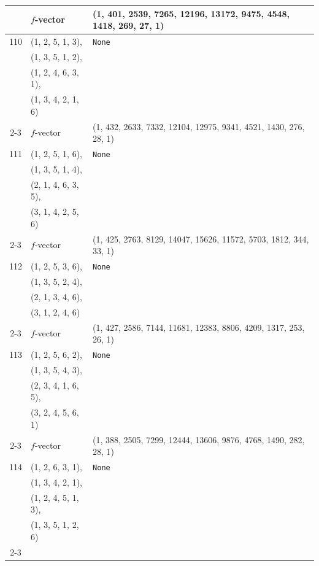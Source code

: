\documentclass[10pt]{amsart}
\numberwithin{equation}{section}
\theoremstyle{plain}
\theoremstyle{definition}
\theoremstyle{remark}
\begin{document}
{\begin{longtable}{c|l|l}
		& $f$-vector & {(1, 401, 2539, 7265, 12196, 13172, 9475, 4548, 1418, 269, 27, 1)} \\
		\midrule
		
		110 & (1, 2, 5, 1, 3), & \texttt{None} \\
		& (1, 3, 5, 1, 2), &  \\
		& (1, 2, 4, 6, 3, 1), &  \\
		& (1, 3, 4, 2, 1, 6) &  \\ \cline{2-3}
		
		& $f$-vector & {(1, 432, 2633, 7332, 12104, 12975, 9341, 4521, 1430, 276, 28, 1)} \\
		\midrule
		
		111 & (1, 2, 5, 1, 6), & \texttt{None} \\
		& (1, 3, 5, 1, 4), &  \\
		& (2, 1, 4, 6, 3, 5), &  \\
		& (3, 1, 4, 2, 5, 6) &  \\ \cline{2-3}
		
		& $f$-vector & {(1, 425, 2763, 8129, 14047, 15626, 11572, 5703, 1812, 344, 33, 1)} \\
		\midrule
		
		112 & (1, 2, 5, 3, 6), & \texttt{None} \\
		& (1, 3, 5, 2, 4), &  \\
		& (2, 1, 3, 4, 6), &  \\
		& (3, 1, 2, 4, 6) &  \\ \cline{2-3}
		
		& $f$-vector & {(1, 427, 2586, 7144, 11681, 12383, 8806, 4209, 1317, 253, 26, 1)} \\
		\midrule
		
		113 & (1, 2, 5, 6, 2), & \texttt{None} \\
		& (1, 3, 5, 4, 3), &  \\
		& (2, 3, 4, 1, 6, 5), &  \\
		& (3, 2, 4, 5, 6, 1) &  \\ \cline{2-3}
		
		& $f$-vector & {(1, 388, 2505, 7299, 12444, 13606, 9876, 4768, 1490, 282, 28, 1)} \\
		\midrule
		
		114 & (1, 2, 6, 3, 1), & \texttt{None} \\
		& (1, 3, 4, 2, 1), &  \\
		& (1, 2, 4, 5, 1, 3), &  \\
		& (1, 3, 5, 1, 2, 6) &  \\ \cline{2-3}
		

\end{longtable}}
\end{document}
